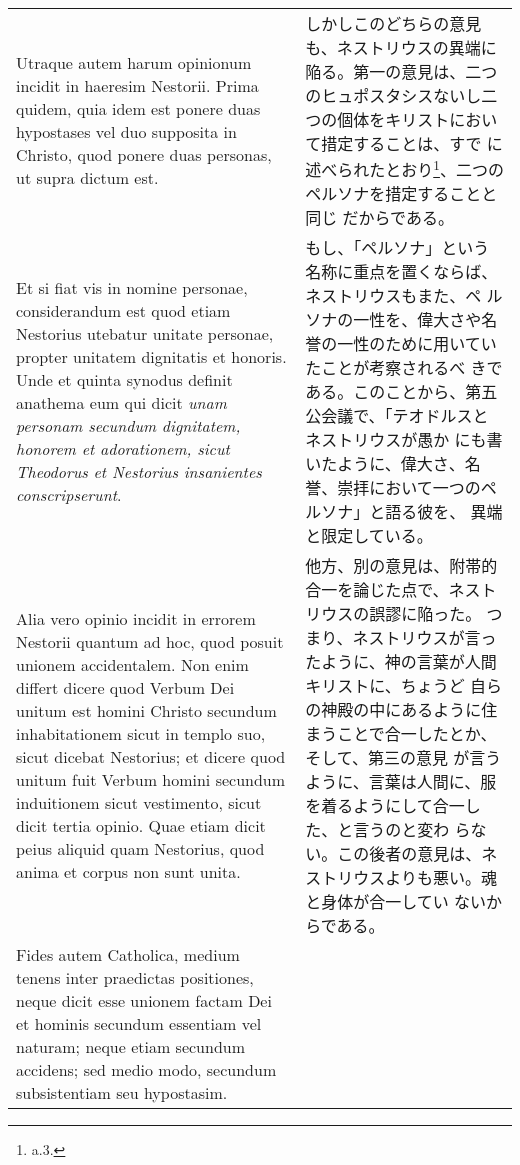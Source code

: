 \documentclass[10pt]{jsarticle} %
\begin{document}
\begin{longtable}{p{21em}p{21em}}
\\

Utraque autem harum opinionum incidit in haeresim Nestorii. Prima
quidem, quia idem est ponere duas hypostases vel duo supposita in
Christo, quod ponere duas personas, ut supra dictum est.

&

しかしこのどちらの意見も、ネストリウスの異端に陥る。第一の意見は、二つ
のヒュポスタシスないし二つの個体をキリストにおいて措定することは、すで
に述べられたとおり\footnote{a.3.}、二つのペルソナを措定することと同じ
だからである。

\\

Et si fiat vis in nomine personae, considerandum est quod etiam
Nestorius utebatur unitate personae, propter unitatem dignitatis et
honoris. Unde et quinta synodus definit anathema eum qui dicit
{\itshape unam personam secundum dignitatem, honorem et adorationem,
sicut Theodorus et Nestorius insanientes conscripserunt}.


&

もし、「ペルソナ」という名称に重点を置くならば、ネストリウスもまた、ペ
ルソナの一性を、偉大さや名誉の一性のために用いていたことが考察されるべ
きである。このことから、第五公会議で、「テオドルスとネストリウスが愚か
にも書いたように、偉大さ、名誉、崇拝において一つのペルソナ」と語る彼を、
異端と限定している。


\\

Alia vero opinio incidit in errorem Nestorii quantum ad hoc, quod
posuit unionem accidentalem. Non enim differt dicere quod Verbum Dei
unitum est homini Christo secundum inhabitationem sicut in templo suo,
sicut dicebat Nestorius; et dicere quod unitum fuit Verbum homini
secundum induitionem sicut vestimento, sicut dicit tertia opinio.
Quae etiam dicit peius aliquid quam Nestorius, quod anima et corpus
non sunt unita.

&

他方、別の意見は、附帯的合一を論じた点で、ネストリウスの誤謬に陥った。
つまり、ネストリウスが言ったように、神の言葉が人間キリストに、ちょうど
自らの神殿の中にあるように住まうことで合一したとか、そして、第三の意見
が言うように、言葉は人間に、服を着るようにして合一した、と言うのと変わ
らない。この後者の意見は、ネストリウスよりも悪い。魂と身体が合一してい
ないからである。


\\

Fides autem Catholica, medium tenens inter praedictas positiones,
neque dicit esse unionem factam Dei et hominis secundum essentiam vel
naturam; neque etiam secundum accidens; sed medio modo, secundum
subsistentiam seu hypostasim.


\end{longtable}
\end{document}
